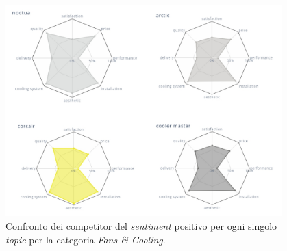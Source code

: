\begin{figure}[ht]
  \centering
  \includegraphics[width=0.95\textwidth]{images/analysis/analysis_fan_spider.jpg}
  \caption{Confronto dei competitor del \textit{sentiment} positivo per ogni singolo \textit{topic} per la categoria \textit{Fans \& Cooling}.}
  \label{fig:analysis_spider_fan}
\end{figure}
